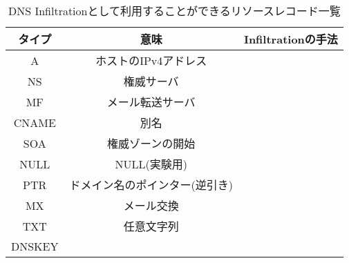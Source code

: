 \begin{table}[htb]
 \centering
  \begin{tabular}{ccc}
    \toprule
    \textbf{タイプ} & \textbf{意味} & \textbf{Infiltrationの手法} \\
    \midrule
    A & ホストのIPv4アドレス &   \\
    NS & 権威サーバ &  \\
    MF & メール転送サーバ &  \\
    CNAME & 別名 &  \\
    SOA & 権威ゾーンの開始 &  \\
    NULL & NULL(実験用) &  \\
    PTR & ドメイン名のポインター(逆引き) &  \\
    MX & メール交換 &  \\
    TXT & 任意文字列 &  \\
    DNSKEY &  & \\
    \bottomrule
  \end{tabular}
 \caption{DNS Infiltrationとして利用することができるリソースレコード一覧}
 \label{tab:infil-type}
\end{table}
